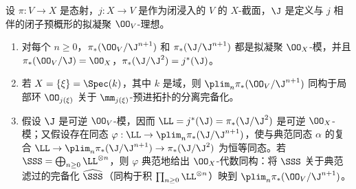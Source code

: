  设 $\pi:V\to X$ 是态射，$j:X\to V$ 是作为闭浸入的 $V$ 的 $X$-截面，$\J$ 是定义与 $j$ 相伴的闭子预概形的拟凝聚 $\OO_V$-理想。
\begin{enumerate}[label=(\roman*)]
\item 对每个 $n\geq0$，$\pi_*(\OO_V/\J^{n+1})$ 和 $\pi_*(\J/\J^{n+1})$ 都是拟凝聚 $\OO_X$-模，并且 $\pi_*(\OO_V/\J)=\OO_X$，$\pi_*(\J/\J^2)=j^*(\J)$。
\item 若 $X=\{\xi\}=\Spec(k)$，其中 $k$ 是域，则 $\plim_n\pi_*(\OO_V/\J^{n+1})$ 同构于局部环 $\OO_{j(\xi)}$ 关于 $\mm_{j(\xi)}$-预进拓扑的分离完备化。
\item 假设 $\J$ 是可逆 $\OO_V$-模，因而 $\LL=j^*(\J)=\pi_*(\J/\J^2)$ 是可逆 $\OO_X$-模；又假设存在同态 $\varphi:\LL\to\plim_n\pi_*(\J/\J^{n+1})$，使与典范同态 $\alpha$ 的复合 $\LL\to\plim_n\pi_*(\J/\J^{n+1})\to\pi_*(\J/\J^2)$ 为恒等同态。若 $\SSS=\bigoplus_{n\geq0}\LL^{\otimes n}$，则 $\varphi$ 典范地给出 $\OO_X$-代数同构：将 $\SSS$ 关于典范滤过的完备化 $\widehat\SSS$（同构于积 $\prod_{n\geq0}\LL^{\otimes n}$）映到 $\plim_n\pi_*(\OO_V/\J^{n+1})$。
\end{enumerate}
